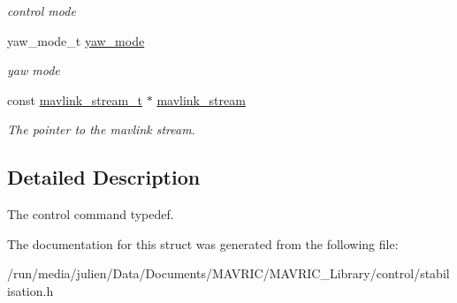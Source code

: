 \begin{DoxyCompactItemize}
\begin{DoxyCompactList}\small\item\em control mode \end{DoxyCompactList}\item 
\hypertarget{structcontrol__command__t_a09dbbab1c7f9204f2227bc25893db355}{yaw\+\_\+mode\+\_\+t \hyperlink{structcontrol__command__t_a09dbbab1c7f9204f2227bc25893db355}{yaw\+\_\+mode}}\label{structcontrol__command__t_a09dbbab1c7f9204f2227bc25893db355}

\begin{DoxyCompactList}\small\item\em yaw mode \end{DoxyCompactList}\item 
\hypertarget{structcontrol__command__t_ad1d046b8b676cc45dc90b48bede98473}{const \hyperlink{structmavlink__stream__t}{mavlink\+\_\+stream\+\_\+t} $\ast$ \hyperlink{structcontrol__command__t_ad1d046b8b676cc45dc90b48bede98473}{mavlink\+\_\+stream}}\label{structcontrol__command__t_ad1d046b8b676cc45dc90b48bede98473}

\begin{DoxyCompactList}\small\item\em The pointer to the mavlink stream. \end{DoxyCompactList}\end{DoxyCompactItemize}


\subsection{Detailed Description}
The control command typedef. 

The documentation for this struct was generated from the following file\+:\begin{DoxyCompactItemize}
\item 
/run/media/julien/\+Data/\+Documents/\+M\+A\+V\+R\+I\+C/\+M\+A\+V\+R\+I\+C\+\_\+\+Library/control/stabilisation.\+h\end{DoxyCompactItemize}
